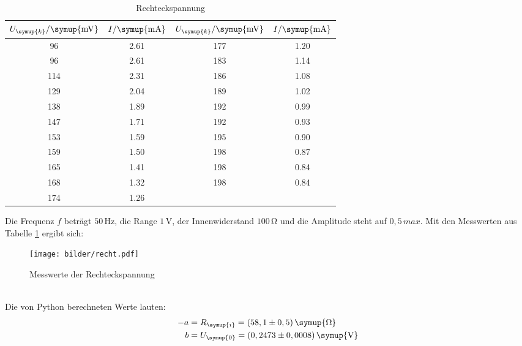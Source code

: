 \begin{table}[H]
  \centering
  \begin{tabular}{c c c c}
    \toprule
    $U_{\symup{k}}/\symup{\si{\milli\volt}}$ & $I/\symup{\si{\milli\ampere}}$  &
    $U_{\symup{k}}/\symup{\si{\milli\volt}}$ & $I/\symup{\si{\milli\ampere}}$  \\
    \midrule
     96   &  2.61  &  177  &  1.20  \\
     96   &  2.61  &  183  &  1.14  \\
    114   &  2.31  &  186  &  1.08  \\
    129   &  2.04  &  189  &  1.02  \\
    138   &  1.89  &  192  &  0.99  \\
    147   &  1.71  &  192  &  0.93  \\
    153   &  1.59  &  195  &  0.90  \\
    159   &  1.50  &  198  &  0.87  \\
    165   &  1.41  &  198  &  0.84  \\
    168   &  1.32  &  198  &  0.84  \\
    174   &  1.26  &  \hrulefill  & \hrulefill  \\
    \bottomrule
  \end{tabular}
  \caption{Rechteckspannung}
  \label{tab:recht}
\end{table}
Die Frequenz $f$ beträgt $50\,\si{\hertz}$, die Range $1 \,\si{\volt}$,
der Innenwiderstand $100\,\si{\ohm}$ und die Amplitude steht auf $0,5 \, max$.
Mit den Messwerten aus Tabelle \ref{tab:recht} ergibt sich:
\begin{figure}[h]
  \centering
  \texttt{[image: bilder/recht.pdf]}
  \caption{Messwerte der Rechteckspannung}
  \label{fig:re}
\end{figure}
\\
Die von Python berechneten Werte lauten:
\begin{align*}
   -a &= R_\symup{i} = (58,1 \pm 0,5)\, \symup{\si{\ohm}} \\ %
   b &= U_\symup{0} = (0,2473 \pm 0,0008)\,\symup{\si{\volt}}
\end{align*}



